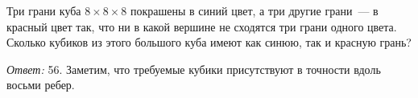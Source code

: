 Три грани куба $8 \times 8 \times 8$ покрашены в синий цвет, а три другие
грани~--- в красный цвет так, что ни в какой вершине не сходятся три грани
одного цвета.
Сколько кубиков из этого большого куба имеют как синюю, так и красную грань?

\solution
\emph{Ответ:} 56.
Заметим, что требуемые кубики присутствуют в точности вдоль восьми ребер.

